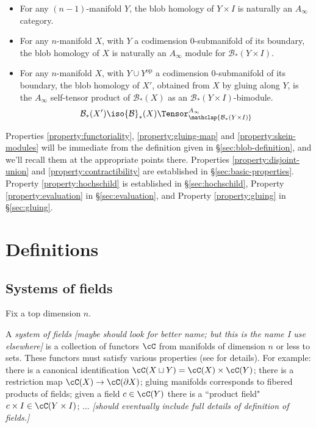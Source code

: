 \documentclass[11pt,leqno]{amsart}
\def\bc{{\mathcal B}}
\def\du{\sqcup}
\def\bd{\partial}
\def\nn#1{{{\it \small [#1]}}}
\begin{document}
\begin{property}
\label{property:gluing}%
\mbox{}%
\begin{itemize}
\item For any $(n-1)$-manifold $Y$, the blob homology of $Y \times I$ is
naturally an $A_\infty$ category. %

\item For any $n$-manifold $X$, with $Y$ a codimension $0$-submanifold of its boundary, the blob homology of $X$ is naturally an
$A_\infty$ module for $\bc_*(Y \times I)$.

\item For any $n$-manifold $X$, with $Y \cup Y^{\text{op}}$ a codimension
$0$-submanifold of its boundary, the blob homology of $X'$, obtained from
$X$ by gluing along $Y$, is the $A_\infty$ self-tensor product of
$\bc_*(X)$ as an $\bc_*(Y \times I)$-bimodule.
\begin{equation*}
\bc_*(X') \iso \bc_*(X) \Tensor^{A_\infty}_{\mathclap{\bc_*(Y \times I)}}
\end{equation*}
\end{itemize}
\end{property}

Properties \ref{property:functoriality}, \ref{property:gluing-map} and \ref{property:skein-modules} will be immediate from the definition given in
\S \ref{sec:blob-definition}, and we'll recall them at the appropriate points there. 
Properties \ref{property:disjoint-union} and \ref{property:contractibility} are established in \S \ref{sec:basic-properties}.
Property \ref{property:hochschild} is established in \S \ref{sec:hochschild}, Property \ref{property:evaluation} in \S \ref{sec:evaluation},
and Property \ref{property:gluing} in \S \ref{sec:gluing}.

\section{Definitions}
\label{sec:definitions}

\subsection{Systems of fields}
\label{sec:fields}

Fix a top dimension $n$.

A {\it system of fields}
\nn{maybe should look for better name; but this is the name I use elsewhere}
is a collection of functors $\cC$ from manifolds of dimension $n$ or less
to sets.
These functors must satisfy various properties (see \cite{kw:tqft} for details).
For example:
there is a canonical identification $\cC(X \du Y) = \cC(X) \times \cC(Y)$;
there is a restriction map $\cC(X) \to \cC(\bd X)$;
gluing manifolds corresponds to fibered products of fields;
given a field $c \in \cC(Y)$ there is a ``product field"
$c\times I \in \cC(Y\times I)$; ...
\nn{should eventually include full details of definition of fields.}
\end{document}
